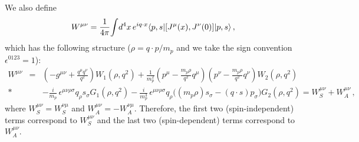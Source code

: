 \documentclass[a4paper,12pt]{article}
\newcommand{\bea}{\begin{eqnarray}}
\newcommand{\eea}{\end{eqnarray}}
\newcommand{\nn}{\nonumber}
\begin{document}
We also define
\begin{equation}  \label{forw-amp2}
 W^{\mu\nu} = {1 \over 4\pi}\!\int\! d^4x\, e^{iq\cdot x}
  \langle {p,s}| [ J^\mu(x),J^\nu(0)] |{p,s}\rangle
\,,
\end{equation}
which has the following structure ($\rho=q\cdot p/m_p$ and we 
take the sign convention $\epsilon^{0123}=1$):
\bea \label{Wmunu}
 W^{\mu\nu} &=
  &\left( -g^{\mu\nu} + \frac{q^\mu q^\nu}{q^2}\right) W_1(\rho,q^2) 
  + \frac1{m_p^2} \left( p^\mu - \frac{m_p\rho}{q^2} q^\mu \right)
    \left( p^\nu - \frac{m_p\rho}{q^2} q^\nu \right) W_2(\rho,q^2)  \\*
	\nn
  && - \frac i{m_p}\, \epsilon^{\mu\nu\rho\sigma} q_\rho s_\sigma G_1(\rho,q^2)
  - \frac i{m_p^3}\, \epsilon^{\mu\nu\rho\sigma} q_\rho
   \bigl( (m_p\rho) s_\sigma - (q\cdot s) p_\sigma \bigr)
G_2(\rho,q^2)=W_S^{\mu\nu}+W_A^{\mu\nu}
\,,
\eea
where $W_S^{\mu\nu}=W_S^{\nu\mu}$ and $W_A^{\mu\nu}=-W_A^{\nu\mu}$. 
Therefore, the first two (spin-independent) terms correspond to $W_S^{\mu\nu}$ 
and the last two (spin-dependent) terms correspond to $W_A^{\mu\nu}$.
\end{document}
